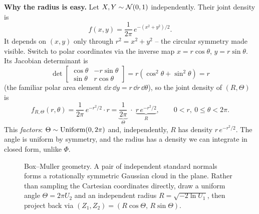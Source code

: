 \begin{whybox}
\textbf{Why the radius is easy.} Let $X,Y \sim \mathcal{N}(0,1)$ independently. Their joint
density is
\[
  f(x,y) = \frac{1}{2\pi}\,e^{-(x^2+y^2)/2}.
\]
It depends on $(x,y)$ only through $r^2 = x^2+y^2$ -- the circular symmetry made visible.
Switch to polar coordinates via the inverse map $x = r\cos\theta$, $y=r\sin\theta$. Its Jacobian
determinant is
\[
  \det\!\begin{bmatrix}\cos\theta & -r\sin\theta \\ \sin\theta & r\cos\theta\end{bmatrix}
  = r(\cos^2\theta + \sin^2\theta) = r
\]
(the familiar polar area element $\dd x\,\dd y = r\,\dd r\,\dd\theta$), so the joint
density of $(R,\Theta)$ is
\[
  f_{R,\Theta}(r,\theta) = \frac{1}{2\pi}\,e^{-r^2/2}\cdot r
  = \underbrace{\frac{1}{2\pi}}_{\Theta}\;\cdot\;\underbrace{r\,e^{-r^2/2}}_{R},
  \qquad 0<r,\ 0\le\theta<2\pi.
\]
This \emph{factors}: $\Theta \sim \operatorname{Uniform}(0,2\pi)$ and, independently, $R$ has density
$r\,e^{-r^2/2}$. The angle is uniform by symmetry, and the radius has a
density we can integrate in closed form, unlike $\Phi$.
\end{whybox}

\begin{figure}[H]
\centering
{}
\caption{Box--Muller geometry. A pair of independent standard normals forms a rotationally
symmetric Gaussian cloud in the plane. Rather than sampling the Cartesian coordinates directly, draw
a uniform angle $\Theta=2\pi U_2$ and an independent radius $R=\sqrt{-2\ln U_1}$, then project back
via $(Z_1,Z_2)=(R\cos\Theta,\,R\sin\Theta)$.}
\label{ch16:fig-boxmuller}
\end{figure}

